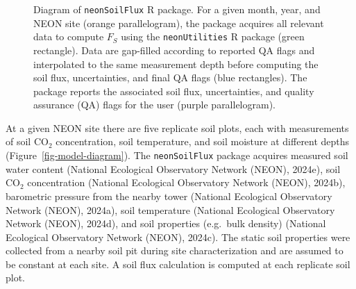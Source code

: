 \documentclass[
  letterpaper,
  DIV=11,
  numbers=noendperiod]{scrartcl}
\begin{document}
\begin{figure}


\caption{\label{fig-package-diagram}Diagram of \texttt{neonSoilFlux} R
package. For a given month, year, and NEON site (orange parallelogram),
the package acquires all relevant data to compute \(F_{S}\) using the
\texttt{neonUtilities} R package (green rectangle). Data are gap-filled
according to reported QA flags and interpolated to the same measurement
depth before computing the soil flux, uncertainties, and final QA flags
(blue rectangles). The package reports the associated soil flux,
uncertainties, and quality assurance (QA) flags for the user (purple
parallelogram).}

\end{figure}%

At a given NEON site there are five replicate soil plots, each with
measurements of soil CO\(_{2}\) concentration, soil temperature, and
soil moisture at different depths (Figure~\ref{fig-model-diagram}). The
\texttt{neonSoilFlux} package acquires measured soil water content
(National Ecological Observatory Network (NEON), 2024e), soil CO\(_{2}\)
concentration (National Ecological Observatory Network (NEON), 2024b),
barometric pressure from the nearby tower (National Ecological
Observatory Network (NEON), 2024a), soil temperature (National
Ecological Observatory Network (NEON), 2024d), and soil properties
(e.g.~bulk density) (National Ecological Observatory Network (NEON),
2024c). The static soil properties were collected from a nearby soil pit
during site characterization and are assumed to be constant at each
site. A soil flux calculation is computed at each replicate soil plot.
\end{document}

